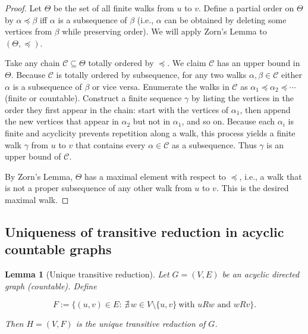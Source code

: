\documentclass[11pt]{article}
\newtheorem{lemma}[definition]{Lemma}
\begin{document}
\begin{proof}
Let $\Theta$ be the set of all finite walks from $u$ to $v$. Define a
partial order on $\Theta$ by $\alpha\preceq\beta$ iff $\alpha$ is a
subsequence of $\beta$ (i.e., $\alpha$ can be obtained by deleting some
vertices from $\beta$ while preserving order). We will apply Zorn's Lemma
to $(\Theta,\preceq)$.

Take any chain $\mathcal C\subseteq\Theta$ totally ordered by $\preceq$.
We claim $\mathcal C$ has an upper bound in $\Theta$. Because $\mathcal C$
is totally ordered by subsequence, for any two walks $\alpha,\beta\in\mathcal C$
either $\alpha$ is a subsequence of $\beta$ or vice versa. Enumerate the
walks in $\mathcal C$ as $\alpha_1\preceq\alpha_2\preceq\cdots$ (finite or
countable). Construct a finite sequence $\gamma$ by listing the vertices
in the order they first appear in the chain: start with the vertices of
$\alpha_1$, then append the new vertices that appear in $\alpha_2$ but
not in $\alpha_1$, and so on. Because each $\alpha_i$ is finite and
acyclicity prevents repetition along a walk, this process yields a finite
walk $\gamma$ from $u$ to $v$ that contains every $\alpha\in\mathcal C$
as a subsequence. Thus $\gamma$ is an upper bound of $\mathcal C$.

By Zorn's Lemma, $\Theta$ has a maximal element with respect to $\preceq$,
i.e., a walk that is not a proper subsequence of any other walk from $u$
to $v$. This is the desired maximal walk.
\end{proof}

\subsection*{Uniqueness of transitive reduction in acyclic countable graphs}
\begin{lemma}[Unique transitive reduction]
Let $G=(V,E)$ be an acyclic directed graph (countable). Define


\[
F:=\{(u,v)\in E:\ \nexists\, w\in V\setminus\{u,v\}\ \text{with } uR w \text{ and } wR v\}.
\]


Then $H=(V,F)$ is the unique transitive reduction of $G$.
\end{lemma}
\end{document}

